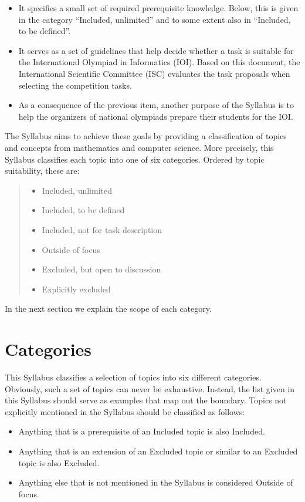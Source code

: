 \documentclass[a4paper,11pt,oneside]{article}
\newcommand{\cmark}{\ding{51}}%
\newcommand{\xmark}{\ding{55}}%
\newcommand{\Cincluded}{{\small\cmark}}
\newcommand{\Cdefine}{{\small\cmark\faFileTextO}}
\newcommand{\Ccodeonly}{{\small\cmark\faFileText}}
\newcommand{\Cnofocus}{{\small\faQuestion}}
\newcommand{\Cexmaybe}{{\small\xmark\faQuestionCircle}}
\newcommand{\Cexcluded}{{\small\xmark}}
\newcommand{\Iincluded}{\item[\hbox to 1.8em{\Cincluded\hfill}]}
\newcommand{\Idefine}{\item[\hbox to 1.8em{\Cdefine\hfill}]}
\newcommand{\Icodeonly}{\item[\hbox to 1.8em{\Ccodeonly\hfill}]}
\newcommand{\Inofocus}{\item[\hbox to 1.8em{\Cnofocus\hfill}]}
\newcommand{\Iexmaybe}{\item[\hbox to 1.8em{\Cexmaybe\hfill}]}
\newcommand{\Iexcluded}{\item[\hbox to 1.8em{\Cexcluded\hfill}]}
\newenvironment{myitemize}{\begin{quote}\begin{itemize}\itemsep 0pt}{\end{itemize}\end{quote}}
\begin{document}
\begin{itemize}
\item
It specifies a small set of required prerequisite knowledge.
Below, this is given in the category ``Included, unlimited''
and to some extent also in ``Included, to be defined''.

\item
It serves as a set of guidelines that help decide whether a task is 
suitable for the International Olympiad in Informatics (IOI).
Based on this document, the International Scientific Committee (ISC)
evaluates the task proposals when selecting the competition tasks.

\item
As a consequence of the previous item, another purpose of the Syllabus 
is to help the organizers of national olympiads prepare
their students for the IOI.

\end{itemize}

The Syllabus aims to achieve these goals by providing a classification of topics and 
concepts from mathematics and computer science. 
More precisely, this Syllabus classifies each topic into one of six categories.
Ordered by topic suitability, these are:

\begin{myitemize}
\Iincluded Included, unlimited
\Idefine   Included, to be defined
\Icodeonly Included, not for task description
\Inofocus  Outside of focus
\Iexmaybe  Excluded, but open to discussion
\Iexcluded Explicitly excluded
\end{myitemize}

\noindent
In the next section we explain the scope of each category.


\section{Categories}\label{sec:categories}%

This Syllabus classifies a selection of topics into six different ca\-tegories. 
Obviously, such a set of topics can never be exhaustive.
Instead, the list given in this Syllabus should serve as examples that map out the boundary.
Topics not explicitly mentioned in the Syllabus should be classified as follows:
\begin{itemize}
\itemsep -3pt
\item Anything that is a prerequisite of an Included topic is also Included.
\item Anything that is an extension of an Excluded topic or similar to an Excluded topic is also Excluded.
\item Anything else that is not mentioned in the Syllabus is considered Outside of focus.
\end{itemize}
\end{document}

